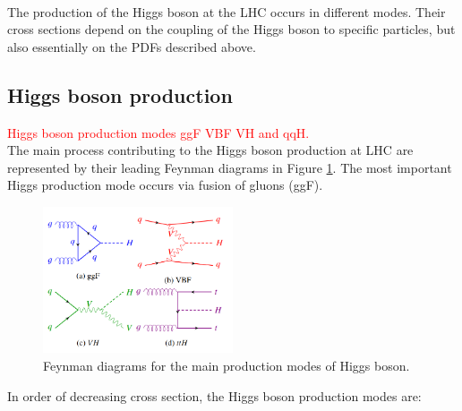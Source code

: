 \\
The production of the Higgs boson at the LHC occurs in different modes. Their cross sections depend on the coupling of the Higgs boson to specific particles, but also essentially on the PDFs described above.
\subsection{Higgs boson production}
\label{chap1:EWSB:HP}
\textcolor{red}{Higgs boson production modes ggF VBF VH and qqH. \\}
The main process contributing to the Higgs boson production at LHC are represented by their leading Feynman diagrams in Figure \ref{fig:chap1:EWSB:HP}. The most important Higgs production mode occurs via fusion of gluons (ggF). 
\begin{figure}[ht]
    \centering
    \includegraphics[width=0.5\textwidth]{Ch1/Img/Higgs_prod_modes.png}
    \caption{Feynman diagrams for the main production modes of Higgs boson.}
    \label{fig:chap1:EWSB:HP}
\end{figure}
In order of decreasing cross section, the Higgs boson production modes are:
